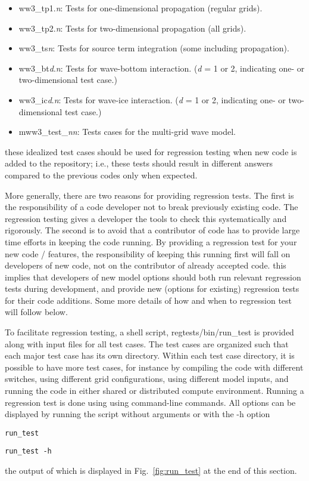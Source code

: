 \documentclass[12pt]{article}
\newcommand{\file}{\sf}
\newcommand{\code}{\tt}
\newcommand{\command}[1]{\begin{center}{\code #1}\end{center}}
\begin{document}
\begin{itemize}
\item {\file ww3\_tp1.{\it n}}: Tests for one-dimensional propagation (regular
       grids). 
\item {\file ww3\_tp2.{\it n}}: Tests for two-dimensional propagation (all
       grids).
\item {\file ww3\_ts{\it n}}: Tests for source term integration (some
       including propagation).
\item {\file ww3\_bt{\it d}.{\it n}}: Tests for wave-bottom interaction. ({\it d} = 1 or 2, indicating one- or two-dimensional test case.)
\item {\file ww3\_ic{\it d}.{\it n}}: Tests for wave-ice interaction. ({\it d} = 1 or 2, indicating one- or two-dimensional test case.)
\item {\file mww3\_test\_{\it nn}}: Tests cases for the multi-grid wave model.
\end{itemize}

\noindent
these idealized test cases should be used for regression testing when new code
is added to the repository; i.e., these tests should result in different
answers compared to the previous codes only when expected. 

More generally, there are two reasons for providing regression tests. The
first is the responsibility of a code developer not to break previously
existing code. The regression testing gives a developer the tools to check
this systematically and rigorously. The second is to avoid that a contributor
of code has to provide large time efforts in keeping the code running. By
providing a regression test for your new code / features, the responsibility
of keeping this running first will fall on developers of new code, not on the
contributor of already accepted code. this implies that developers of new
model options should both run relevant regression tests during development,
and provide new (options for existing) regression tests for their code
additions. Some more details of how and when to regression test will follow
below.


To facilitate regression testing, a shell script, {\file
  regtests/bin/run\_test} is provided along with input files for all test
cases. The test cases are organized such that each major test case has its own
directory. Within each test case directory, it is possible to have more test
cases, for instance by compiling the code with different switches, using
different grid configurations, using different model inputs, and running the
code in either shared or distributed compute environment. Running a regression
test is done using using command-line commands. All options can be displayed
by running the script without arguments or with the {\file -h} option
\command{run\_test} \command{run\_test -h} the output of which is displayed in
Fig.~\ref{fig:run_test} at the end of this section.
\end{document}
